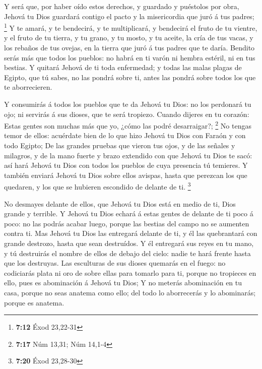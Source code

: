  Y será que, por haber oído estos derechos, y guardado y
puéstolos por obra, Jehová tu Dios guardará contigo el pacto y la
misericordia que juró á tus padres; \footnote{\textbf{7:12} Éxod
  23,22-31}  Y te amará, y te bendecirá, y te multiplicará,
y bendecirá el fruto de tu vientre, y el fruto de tu tierra, y tu grano,
y tu mosto, y tu aceite, la cría de tus vacas, y los rebaños de tus
ovejas, en la tierra que juró á tus padres que te daría. 
Bendito serás más que todos los pueblos: no habrá en ti varón ni hembra
estéril, ni en tus bestias.  Y quitará Jehová de ti toda
enfermedad; y todas las malas plagas de Egipto, que tú sabes, no las
pondrá sobre ti, antes las pondrá sobre todos los que te aborrecieren.

 Y consumirás á todos los pueblos que te da Jehová tu Dios:
no los perdonará tu ojo; ni servirás á sus dioses, que te será tropiezo.
 Cuando dijeres en tu corazón: Estas gentes son muchas más
que yo, ¿cómo las podré desarraigar?; \footnote{\textbf{7:17} Núm 13,31;
  Núm 14,1-4}  No tengas temor de ellos: acuérdate bien de
lo que hizo Jehová tu Dios con Faraón y con todo Egipto; 
De las grandes pruebas que vieron tus ojos, y de las señales y milagros,
y de la mano fuerte y brazo extendido con que Jehová tu Dios te sacó:
así hará Jehová tu Dios con todos los pueblos de cuya presencia tú
temieres.  Y también enviará Jehová tu Dios sobre ellos
avispas, hasta que perezcan los que quedaren, y los que se hubieren
escondido de delante de ti. \footnote{\textbf{7:20} Éxod 23,28-30}

 No desmayes delante de ellos, que Jehová tu Dios está en
medio de ti, Dios grande y terrible.  Y Jehová tu Dios
echará á estas gentes de delante de ti poco á poco: no las podrás acabar
luego, porque las bestias del campo no se aumenten contra ti.
 Mas Jehová tu Dios las entregará delante de ti, y él las
quebrantará con grande destrozo, hasta que sean destruídos.
 Y él entregará sus reyes en tu mano, y tú destruirás el
nombre de ellos de debajo del cielo: nadie te hará frente hasta que los
destruyas.  Las esculturas de sus dioses quemarás en el
fuego: no codiciarás plata ni oro de sobre ellas para tomarlo para ti,
porque no tropieces en ello, pues es abominación á Jehová tu Dios;
 Y no meterás abominación en tu casa, porque no seas
anatema como ello; del todo lo aborrecerás y lo abominarás; porque es
anatema.

